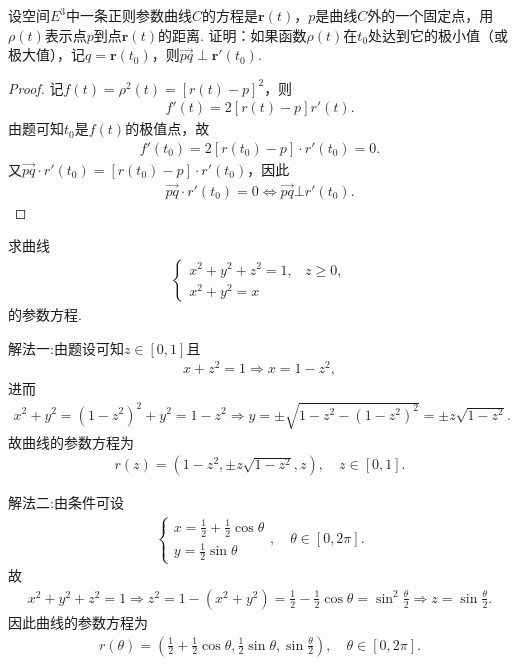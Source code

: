 \documentclass[../../main.tex]{subfiles}%
\begin{document}
\begin{example}
设空间$E^3$中一条正则参数曲线$C$的方程是$\bm{r}(t)$，$p$是曲线$C$外的一个固定点，用$\rho(t)$表示点$p$到点$\bm{r}(t)$的距离. 证明：如果函数$\rho(t)$在$t_0$处达到它的极小值（或极大值），记$q = \bm{r}(t_0)$，则$\overrightarrow{pq} \perp \bm{r}'(t_0)$.
\end{example}
\begin{proof}
记$f(t)=\rho^2(t)=\left[r(t)-p\right]^2$，则
\begin{align*}
f'(t)=2\left[r(t)-p\right]r'(t).
\end{align*}
由题可知$t_0$是$f(t)$的极值点，故
\begin{align*}
f'(t_0)=2\left[r(t_0)-p\right]\cdot r'(t_0)=0.
\end{align*}
又$\overrightarrow{pq}\cdot r'(t_0)=\left[r(t_0)-p\right]\cdot r'(t_0)$，因此
\begin{align*}
\overrightarrow{pq}\cdot r'(t_0)=0\Longleftrightarrow \overrightarrow{pq}\bot r'(t_0).
\end{align*}
\end{proof}

\begin{example}
求曲线
\begin{align*}
\begin{cases}
x^2 + y^2 + z^2 = 1, & z \geqslant 0, \\
x^2 + y^2 = x
\end{cases}
\end{align*}
的参数方程.
\end{example}
\begin{solution}

{\color{blue}解法一:}由题设可知$z\in\left[0,1\right]$且\begin{align*}
x+z^2=1\Longrightarrow x=1-z^2,
\end{align*}进而\begin{align*}
x^2+y^2=\left(1-z^2\right)^2+y^2=1-z^2\Longrightarrow y=\pm\sqrt{1-z^2-\left(1-z^2\right)^2}=\pm z\sqrt{1-z^2}.
\end{align*}故曲线的参数方程为\begin{align*}
r(z)=\left(1-z^2,\pm z\sqrt{1-z^2},z\right),\quad z\in\left[0,1\right].
\end{align*}

{\color{blue}解法二:}由条件可设\begin{align*}
\begin{cases}
x=\frac{1}{2}+\frac{1}{2}\cos\theta\\
y=\frac{1}{2}\sin\theta
\end{cases},\quad \theta\in\left[0,2\pi\right].
\end{align*}故\begin{align*}
x^2+y^2+z^2=1\Longrightarrow z^2=1-\left(x^2+y^2\right)=\frac{1}{2}-\frac{1}{2}\cos\theta=\sin^2\frac{\theta}{2}\Longrightarrow z=\sin\frac{\theta}{2}.
\end{align*}因此曲线的参数方程为\begin{align*}
r(\theta)=\left(\frac{1}{2}+\frac{1}{2}\cos\theta,\frac{1}{2}\sin\theta,\sin\frac{\theta}{2}\right),\quad \theta\in\left[0,2\pi\right].
\end{align*}

\end{solution}
\end{document}
